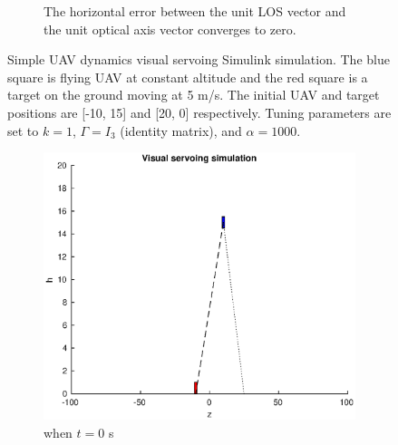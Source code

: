 \begin{figure}[htbp]
\begin{subfigure}[t]{0.8\linewidth}
		\caption{The horizontal error between the unit LOS vector and the unit optical axis vector converges to zero.}
	\end{subfigure}	
	\caption[Simple UAV dynamics visual servoing Simulink simulation.]{Simple UAV dynamics visual servoing Simulink simulation. The blue square is flying UAV at constant altitude and the red square is a target on the ground moving at 5 m/s. The initial UAV and target positions are [-10, 15] and [20, 0] respectively. Tuning parameters are set to $k=1$, $\Gamma=I_3$ (identity matrix), and $\alpha=1000$.}
	\label{simple_simulation}
\end{figure}

\begin{figure}[htbp]
	\centering
	\begin{subfigure}[t]{0.45\linewidth}
		\includegraphics[width=\textwidth]{images/chapter4/another_simple_zero}
		\caption{when $t=0$ s}
	\end{subfigure}
	~ %
	\begin{subfigure}[t]{0.45\linewidth}

\end{subfigure}
\end{figure}
